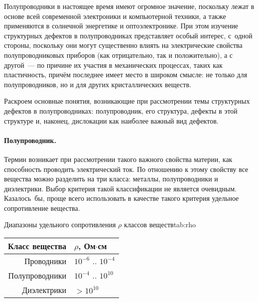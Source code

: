 \documentclass[a4paper, 14pt, titlepage]{extarticle}
\begin{document}



  \label{sec:intro}

  Полупроводники в настоящее время имеют огромное значение, поскольку лежат в основе всей
  современной электроники и компьютерной техники, а также применяются в солнечной энергетике и
  оптоэлектронике. При этом изучение структурных дефектов в полупроводниках представляет особый
  интерес, с~одной стороны, поскольку они могут существенно влиять на электрические свойства
  полупроводниковых приборов (как отрицательно, так и положительно), а с другой~--- по причине их
  участия в механических процессах, таких как пластичность, причём последнее имеет место в широком
  смысле: не только для полупроводников, но и для других кристаллических веществ.

  Раскроем основные понятия, возникающие при рассмотрении темы структурных дефектов в полупроводниках:
  полупроводник, его структура, дефекты в этой структуре и, наконец, дислокации как наиболее важный
  вид дефектов.

  \paragraph{Полупроводник.} Термин  возникает при рассмотрении такого важного
  свойства материи, как способность проводить электрический ток. По отношению к этому свойству все
  вещества можно разделить на три класса: металлы, полупроводники и диэлектрики. Выбор критерия
  такой классификации не является очевидным. Казалось~бы, проще всего использовать в качестве такого
  критерия удельное сопротивление вещества.

  \begin{mytable}{Диапазоны удельного сопротивления $\rho$ классов веществ}{tab:rho}
    \begin{tabular}{r|l}
      Класс вещества & $\rho$, Ом$\cdot$см \\
      \hline
      Проводники     & $10^{-6}$ .. $10^{-4}$\\
      Полупроводники & $10^{-4}$ .. $10^{10}$\\
      Диэлектрики    & $> 10^{10}$\\
    \end{tabular}
  \end{mytable}
\end{document}
